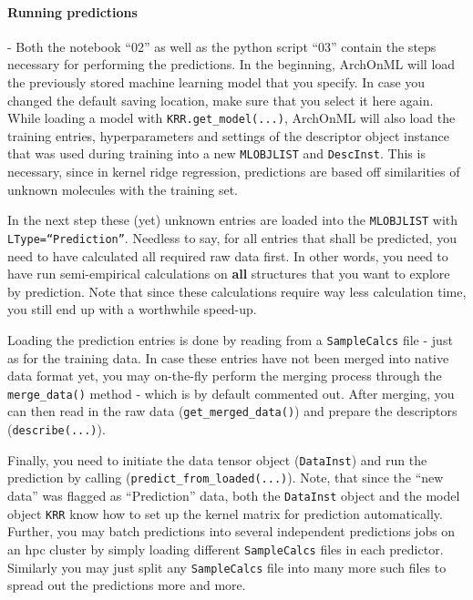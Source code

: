 \documentclass[12pt]{achemso}
\begin{document}
\paragraph{Running predictions} - Both the notebook ``02'' as well as the python script ``03'' contain the steps necessary for performing the predictions. In the beginning, ArchOnML will load the previously stored machine learning model that you specify. In case you changed the default saving location, make sure that you select it here again. While loading a model with \texttt{KRR.get\_model(...)}, ArchOnML will also load the training entries, hyperparameters and settings of the descriptor object instance that was used during training into a new \texttt{MLOBJLIST} and \texttt{DescInst}. This is necessary, since in kernel ridge regression, predictions are based off similarities of unknown molecules with the training set.

\noindent In the next step these (yet) unknown entries are loaded into the \texttt{MLOBJLIST} with \linebreak \texttt{LType=``Prediction''}. Needless to say, for all entries that shall be predicted, you need to have calculated all required raw data first. In other words, you need to have run semi-empirical calculations on \textbf{all} structures that you want to explore by prediction. Note that since these calculations require way less calculation time, you still end up with a worthwhile speed-up.

\noindent Loading the prediction entries is done by reading from a \texttt{SampleCalcs} file - just as for the training data. In case these entries have not been merged into native data format yet, you may on-the-fly perform the merging process through the \texttt{merge\_data()} method - which is by default commented out. After merging, you can then read in the raw data (\texttt{get\_merged\_data()}) and prepare the descriptors (\texttt{describe(...)}).

\noindent Finally, you need to initiate the data tensor object (\texttt{DataInst}) and run the prediction by calling (\texttt{predict\_from\_loaded(...)}). Note, that since the ``new data'' was flagged as ``Prediction'' data, both the \texttt{DataInst} object and the model object \texttt{KRR} know how to set up the kernel matrix for prediction automatically. Further, you may batch predictions into several independent predictions jobs on an hpc cluster by simply loading different \texttt{SampleCalcs} files in each predictor. Similarly you may just split any \texttt{SampleCalcs} file into many more such files to spread out the predictions more and more. 
\end{document}
